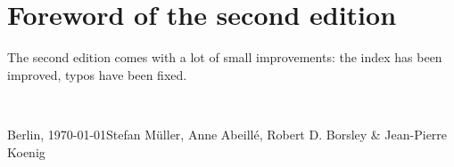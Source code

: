 \section*{Foreword of the second edition}

The second edition comes with a lot of small improvements: the index has been improved, typos have
been fixed.








~\medskip

\noindent
Berlin, \today\hfill Stefan Müller, Anne Abeillé, Robert D. Borsley \& Jean-​Pierre Koenig


